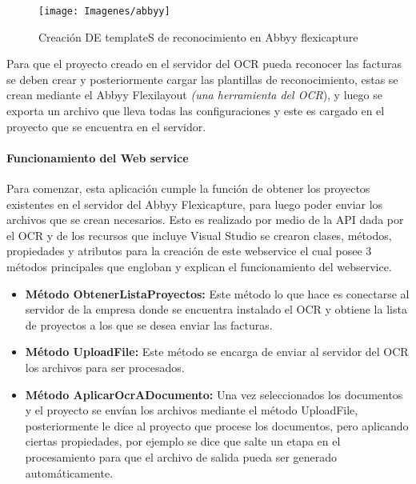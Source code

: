 		\begin{figure}[H]
			\texttt{[image: Imagenes/abbyy]}
			\caption{Creación DE templateS de reconocimiento en Abbyy flexicapture}
		\end{figure}
		
		Para que el proyecto creado en el servidor del OCR pueda reconocer las facturas se deben crear y posteriormente cargar las plantillas de reconocimiento, estas se crean mediante el Abbyy Flexilayout \textit{(una herramienta del OCR}), y luego se exporta un archivo que lleva todas las configuraciones y este es cargado en el proyecto que se encuentra en el servidor.
		
			\paragraph{Funcionamiento del Web service} 
			\par
			Para comenzar, esta aplicación cumple la función de obtener los proyectos existentes en el servidor del Abbyy Flexicapture, para luego poder enviar los archivos que se crean necesarios. Esto es realizado por medio de la API dada por el OCR y de los recursos que incluye Visual Studio se crearon clases, métodos, propiedades y atributos para la creación de este webservice el cual posee 3 métodos principales que engloban y explican el funcionamiento del webservice.
			
			\begin{itemize}
				\item \textbf{Método ObtenerListaProyectos:} Este método lo que hace es conectarse al servidor de la empresa donde se encuentra instalado el OCR y obtiene la lista de proyectos a los que se desea enviar las facturas.
				
				\item \textbf{Método UploadFile:} Este método se encarga de enviar al servidor del OCR los archivos para ser procesados.
				
				\item \textbf{Método AplicarOcrADocumento:} Una vez seleccionados los documentos y el proyecto se envían los archivos mediante el método UploadFile, posteriormente le dice al proyecto que procese los documentos, pero aplicando ciertas propiedades, por ejemplo se dice que salte un etapa en el procesamiento para que el archivo de salida pueda ser generado automáticamente.

			\end{itemize}	
		
				
